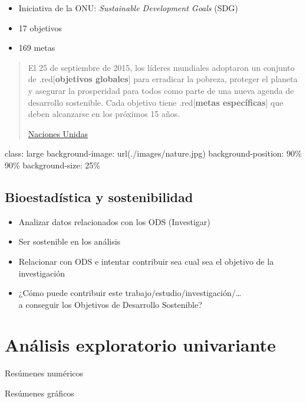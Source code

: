 \documentclass[
]{book}
\providecommand{\tightlist}{%
  \setlength{\itemsep}{0pt}\setlength{\parskip}{0pt}}
\begin{document}
\begin{itemize}
\tightlist
\item
  Iniciativa de la ONU: \emph{Sustainable Development Goals} (SDG)
\item
  17 objetivos
\item
  169 metas
\end{itemize}

\begin{quote}
El 25 de septiembre de 2015, los líderes mundiales adoptaron un conjunto de .red{[}\textbf{objetivos globales}{]} para erradicar la pobreza, proteger el planeta y asegurar la prosperidad para todos como parte de una nueva agenda de desarrollo sostenible. Cada objetivo tiene .red{[}\textbf{metas específicas}{]} que deben alcanzarse en los próximos 15 años.

\href{https://www.un.org/sustainabledevelopment/es/objetivos-de-desarrollo-sostenible/}{Naciones Unidas}
\end{quote}

class: large
background-image: url(./images/nature.jpg)
background-position: 90\% 90\%
background-size: 25\%

\hypertarget{bioestaduxedstica-y-sostenibilidad}{%
\section{Bioestadística y sostenibilidad}\label{bioestaduxedstica-y-sostenibilidad}}

\begin{itemize}
\item
  Analizar datos relacionados con los ODS (Investigar)
\item
  Ser sostenible en los análisis
\item
  Relacionar con ODS e intentar contribuir sea cual sea el objetivo de la
  investigación
\item
  ¿Cómo puede contribuir este trabajo/estudio/investigación/\ldots{}\\
  a conseguir los Objetivos de Desarrollo Sostenible?
\end{itemize}

\hypertarget{aed-uni}{%
\chapter{Análisis exploratorio univariante}\label{aed-uni}}

Resúmenes numéricos

Resúmenes gráficos
\end{document}
